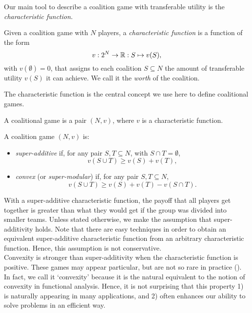 Our main tool to describe a coalition game with transferable utility is the \emph{characteristic function.}
\begin{definition}
Given a coalition game with $N$ players, a \emph{characteristic function} is a function of the form
$$v : 2^N \rightarrow \mathbb{R}: S \mapsto v(S), $$
with $v(\emptyset) = 0$, that assigns to each coalition $S \subseteq N$ the amount of transferable utility $v(S)$ it can achieve.  We call it the \emph{worth} of the coalition.
\end{definition}
The characteristic function is the central concept we use here to define coalitional games.
\begin{definition}
A coalitional game is a pair $(N,v)$, where $v$ is a characteristic function.
\end{definition}
\begin{definition}
A coalition game $(N,v)$ is:
\begin{itemize}
\item \emph{super-additive} if, for any pair $S,T \subseteq N$, with $S \cap T = \emptyset$,
$$v(S \cup T) \geq v(S) + v(T), $$
\item \emph{convex} (or \emph{super-modular}) if,  for any pair $S,T \subseteq N$,
$$v(S \cup T) \geq v(S) + v(T) - v(S \cap T). $$
\end{itemize}
\end{definition}
With a super-additive characteristic function, the payoff that all players get together is greater than what they would get if the group was divided into smaller teams. Unless stated otherwise, we make the assumption that super-additivity holds. Note that there are easy techniques in order to obtain an equivalent super-additive characteristic function from an arbitrary characteristic function.  Hence, this assumption is not conservative.\\
Convexity is stronger than super-additivity when the characteristic function is positive. These games may appear particular, but are not so rare in practice (\cite{ShLeMSAG}). In fact, we call it `convexity' because it is the natural equivalent to the notion of convexity in functional analysis.  Hence, it is not surprising that this property 1) is naturally appearing in many applications, and 2) often enhances our ability to solve problems in an efficient way.

